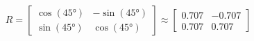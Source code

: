 \documentclass[preview]{standalone}
\begin{document}
\begin{align*}
R = \begin{bmatrix} \cos(45°) & -\sin(45°) \\ \sin(45°) & \cos(45°) \end{bmatrix} \approx \begin{bmatrix} 0.707 & -0.707 \\ 0.707 & 0.707 \end{bmatrix}
\end{align*}
\end{document}
